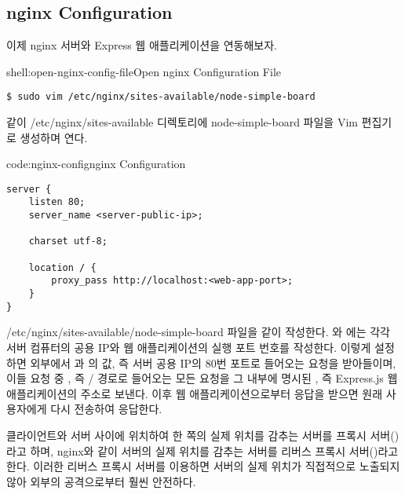 \subsection*{nginx Configuration}

이제 nginx 서버와 Express 웹 애플리케이션을 연동해보자.

\begin{shell}{shell:open-nginx-config-file}{Open nginx Configuration File}
\begin{verbatim}
$ sudo vim /etc/nginx/sites-available/node-simple-board
\end{verbatim}
\end{shell}

\과 같이 /etc/nginx/sites-available 디렉토리에 node-simple-board 파일을 Vim 편집기로 생성하며 연다.

\begin{code}{code:nginx-config}{nginx Configuration}
\begin{verbatim}
server {
    listen 80;
    server_name <server-public-ip>;

    charset utf-8;

    location / {
        proxy_pass http://localhost:<web-app-port>;
    }
}
\end{verbatim}
\end{code}

/etc/nginx/sites-available/node-simple-board 파일을 \와 같이 작성한다. 와 에는 각각 서버 컴퓨터의 공용 IP와 웹 애플리케이션의 실행 포트 번호를 작성한다. 이렇게 설정하면 외부에서 과 의 값, 즉 서버 공용 IP의 80번 포트로 들어오는 요청을 받아들이며, 이들 요청 중 , 즉 / 경로로 들어오는 모든 요청을 그 내부에 명시된 , 즉 Express.js 웹 애플리케이션의 주소로 보낸다. 이후 웹 애플리케이션으로부터 응답을 받으면 원래 사용자에게 다시 전송하여 응답한다.


클라이언트와 서버 사이에 위치하여 한 쪽의 실제 위치를 감추는 서버를 프록시 서버()라고 하며, nginx와 같이 서버의 실제 위치를 감추는 서버를 리버스 프록시 서버()라고 한다. 이러한 리버스 프록시 서버를 이용하면 서버의 실제 위치가 직접적으로 노출되지 않아 외부의 공격으로부터 훨씬 안전하다.


